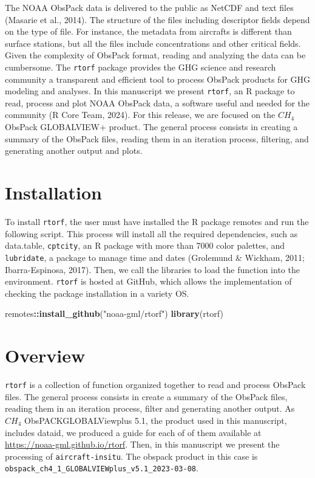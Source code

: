 \documentclass[10pt,a4paper,onecolumn]{article}
\newenvironment{Shaded}{\begin{snugshade}}{\end{snugshade}}
\newcommand{\FunctionTok}[1]{\textcolor[rgb]{0.13,0.29,0.53}{\textbf{#1}}}
\newcommand{\NormalTok}[1]{#1}
\newcommand{\SpecialCharTok}[1]{\textcolor[rgb]{0.81,0.36,0.00}{\textbf{#1}}}
\newcommand{\StringTok}[1]{\textcolor[rgb]{0.31,0.60,0.02}{#1}}
\begin{document}
The NOAA ObsPack data is delivered to the public as NetCDF and text
files (Masarie et al., 2014). The structure of the files including
descriptor fields depend on the type of file. For instance, the metadata
from aircrafts is different than surface stations, but all the files
include concentrations and other critical fields. Given the complexity
of ObsPack format, reading and analyzing the data can be cumbersome. The
\texttt{rtorf} package provides the GHG science and research community a
transparent and efficient tool to process ObsPack products for GHG
modeling and analyses. In this manuscript we present \texttt{rtorf}, an
R package to read, process and plot NOAA ObsPack data, a software useful
and needed for the community (R Core Team, 2024). For this release, we
are focused on the \(CH_4\) ObsPack GLOBALVIEW+ product. The general
process consists in creating a summary of the ObsPack files, reading
them in an iteration process, filtering, and generating another output
and plots.

\section{Installation}\label{installation}

To install \texttt{rtorf}, the user must have installed the R package
remotes and run the following script. This process will install all the
required dependencies, such as data.table, \texttt{cptcity}, an R
package with more than 7000 color palettes, and \texttt{lubridate}, a
package to manage time and dates (Grolemund \& Wickham, 2011;
Ibarra-Espinosa, 2017). Then, we call the libraries to load the function
into the environment. \texttt{rtorf} is hosted at GitHub, which allows
the implementation of checking the package installation in a variety OS.

\begin{Shaded}
\begin{Highlighting}[]
\NormalTok{remotes}\SpecialCharTok{::}\FunctionTok{install\_github}\NormalTok{(}\StringTok{"noaa{-}gml/rtorf"}\NormalTok{)}
\FunctionTok{library}\NormalTok{(rtorf)}
\end{Highlighting}
\end{Shaded}

\section{Overview}\label{overview}

\texttt{rtorf} is a collection of function organized together to read
and process ObsPack files. The general process consists in create a
summary of the ObsPack files, reading them in an iteration process,
filter and generating another output. As \(CH_4\) ObsPACKGLOBALViewplus
5.1, the product used in this manuscript, includes dataid, we produced a
guide for each of of them available at
\url{https://noaa-gml.github.io/rtorf}. Then, in this manuscript we
present the processing of \texttt{aircraft-insitu}. The obspack product
in this case is
\texttt{obspack\_ch4\_1\_GLOBALVIEWplus\_v5.1\_2023-03-08}.
\end{document}
